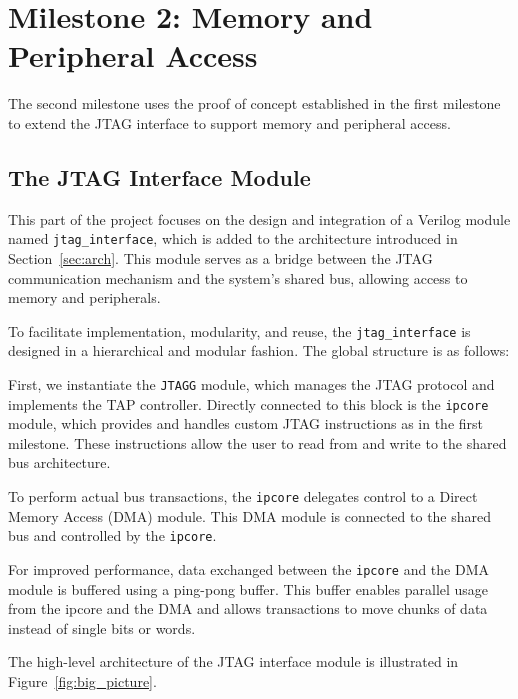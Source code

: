 \documentclass[a4paper,11pt,oneside]{report}
\begin{document}
\section{Milestone 2: Memory and Peripheral Access}

The second milestone uses the proof of concept established in the first milestone to extend the JTAG interface to support memory and peripheral access.

\subsection{The JTAG Interface Module}

This part of the project focuses on the design and integration of a Verilog module named \texttt{jtag\_interface}, which is added to the architecture introduced in Section~\ref{sec:arch}. 
This module serves as a bridge between the JTAG communication mechanism and the system's shared bus, allowing access to memory and peripherals.

To facilitate implementation, modularity, and reuse, the \texttt{jtag\_interface} is designed in a hierarchical and modular fashion. The global structure is as follows:

First, we instantiate the \texttt{JTAGG} module, which manages the JTAG protocol and implements the TAP controller.  
Directly connected to this block is the \texttt{ipcore} module, which provides and handles custom JTAG instructions as in the first milestone.  
These instructions allow the user to read from and write to the shared bus architecture.  

To perform actual bus transactions, the \texttt{ipcore} delegates control to a Direct Memory Access (DMA) module.  
This DMA module is connected to the shared bus and controlled by the \texttt{ipcore}.  

For improved performance, data exchanged between the \texttt{ipcore} and the DMA module is buffered using a ping-pong buffer.  
This buffer enables  parallel usage from the ipcore and the DMA and allows transactions to move chunks of data instead of single bits or words.

The high-level architecture of the JTAG interface module is illustrated in Figure~\ref{fig:big_picture}.
\end{document}
